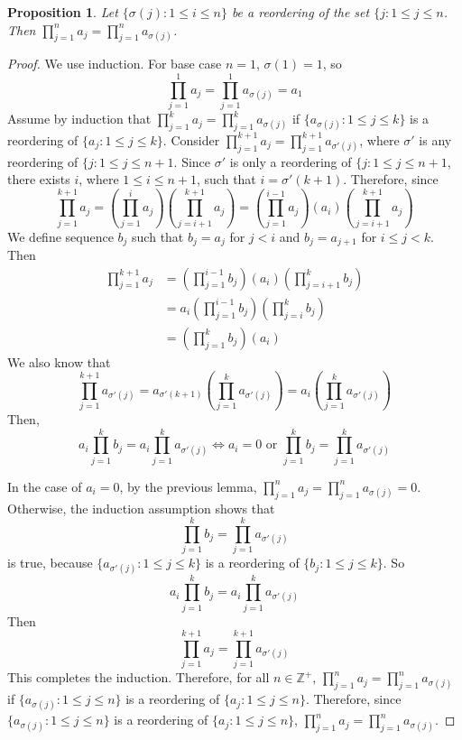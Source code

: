 \documentclass{article}
\newcommand{\Z}{\mathbb{Z}}
\newcommand{\st}{such that }
\newtheorem{prop}[thm]{Proposition}
\begin{document}
\begin{prop}
\label{prod3}
Let $\{\sigma(j):1 \leq i \leq n\}$ be a reordering of the set $\{j: 1 \leq j \leq n$. Then $\prod_{j=1}^n a_j = \prod_{j=1}^n a_{\sigma(j)}$.
\end{prop}

\begin{proof}
We use induction. For base case $n=1$, $\sigma(1)=1$, so $$\prod_{j=1}^1 a_j = \prod_{j=1}^1 a_{\sigma(j)} = a_1$$
Assume by induction that $\prod_{j=1}^k a_j = \prod_{j=1}^k a_{\sigma(j)}$ if $\{a_{\sigma(j)}: 1 \leq j \leq k\}$ is a reordering of $\{a_j: 1 \leq j \leq k\}$. Consider $\prod_{j=1}^{k+1} a_j = \prod_{j=1}^{k+1} a_{\sigma'(j)}$, where $\sigma'$ is any reordering of $\{j:1\leq j \leq n+1$. Since $\sigma'$ is only a reordering of $\{j:1\leq j \leq n+1$, there exists $i$, where $1 \leq i \leq n+1$, \st $i = \sigma'(k+1)$. Therefore, since 
$$\prod_{j=1}^{k+1} a_j = (\prod_{j=1}^{i} a_j)(\prod_{j=i+1}^{k+1} a_j)= (\prod_{j=1}^{i-1} a_j)(a_i)(\prod_{j=i+1}^{k+1} a_j)$$
We define sequence $b_j$ \st $b_j=a_j$ for $j<i$ and $b_j=a_{j+1}$ for $i \leq j < k$. Then
\begin{equation*} 
\begin{split}
\prod_{j=1}^{k+1} a_j &=(\prod_{j=1}^{i-1} b_j)(a_i)(\prod_{j=i+1}^{k} b_j)\\ &=a_i(\prod_{j=1}^{i-1} b_j)(\prod_{j=i}^{k} b_j)\\
&=(\prod_{j=1}^{k} b_j)(a_i)
\end{split}
\end{equation*}
We also know that 
$$\prod_{j=1}^{k+1} a_{\sigma'(j)} = a_{\sigma'(k+1)}(\prod_{j=1}^{k} a_{\sigma'(j)}) =  a_i(\prod_{j=1}^{k} a_{\sigma'(j)})$$
Then, 
$$a_i \prod_{j=1}^k b_j = a_i \prod_{j=1}^k a_{\sigma'(j)} \iff a_i=0 \mbox{ or } \prod_{j=1}^k b_j = \prod_{j=1}^k a_{\sigma'(j)}$$

In the case of $a_i=0$, by the previous lemma, $\prod_{j=1}^n a_j = \prod_{j=1}^n a_{\sigma(j)}=0$. Otherwise, the induction assumption shows that $$\prod_{j=1}^k b_j = \prod_{j=1}^k a_{\sigma'(j)} $$ is true, because $\{a_{\sigma'(j)}: 1 \leq j \leq k\}$ is a reordering of $\{b_{j}: 1 \leq j \leq k\}$. So $$a_i \prod_{j=1}^k b_j = a_i \prod_{j=1}^k a_{\sigma'(j)}$$ Then $$\prod_{j=1}^{k+1} a_j = \prod_{j=1}^{k+1} a_{\sigma'(j)}$$ This completes the induction. Therefore, for all $n \in \Z^+$, $\prod_{j=1}^n a_j = \prod_{j=1}^n a_{\sigma(j)}$ if $\{a_{\sigma(j)}: 1 \leq j \leq n\}$ is a reordering of $\{a_j: 1 \leq j \leq n\}$. Therefore, since $\{a_{\sigma(j)}: 1 \leq j \leq n\}$ is a reordering of $\{a_j: 1 \leq j \leq n\}$, $\prod_{j=1}^n a_j = \prod_{j=1}^n a_{\sigma(j)}$.
\end{proof}
\end{document}
